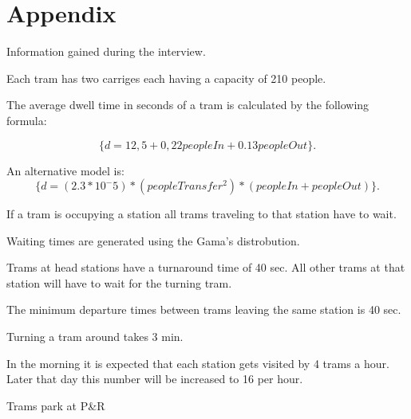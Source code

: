 \section{Appendix}

Information gained during the interview.

Each tram has two carriges each having a capacity of 210 people.

The average dwell time in seconds of a tram is calculated by the following formula:

  \begin{equation}
    \label{eq:eq1}
    \{ d = 12,5 + 0,22 peopleIn + 0.13 peopleOut \}.
  \end{equation}

An alternative model is:
  \begin{equation}
    \label{eq:eq1}
    \{ d = (2.3 * 10 ^ -5) * (peopleTransfer ^ 2) * (peopleIn + peopleOut) \}.
  \end{equation}

If a tram is occupying a station all trams traveling to that station have to wait.

Waiting times are generated using the Gama's distrobution.

Trams at head stations have a turnaround time of 40 sec. 
All other trams at that station will have to wait for the turning tram.

The minimum departure times between trams leaving the same station is 40 sec.

Turning a tram around takes 3 min.

In the morning it is expected that each station gets visited by 4 trams a hour.
Later that day this number will be increased to 16 per hour.

Trams park at P\&R